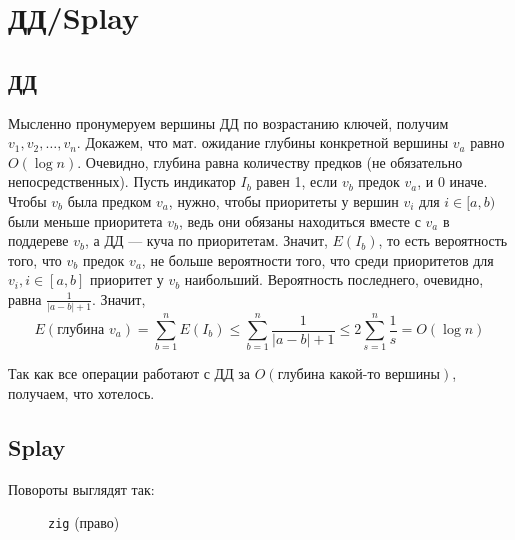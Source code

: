 \section{ДД/Splay}

\subsection{ДД}
Мысленно пронумеруем вершины ДД по возрастанию ключей, получим $v_1, v_2, \ldots, v_n$. Докажем, что мат. ожидание глубины конкретной вершины $v_a$ равно $O(\log n)$. Очевидно, глубина равна количеству предков (не обязательно непосредственных). Пусть индикатор $I_b$ равен 1, если $v_b$ предок $v_a$, и 0 иначе. Чтобы $v_b$ была предком $v_a$, нужно, чтобы приоритеты у вершин $v_i$ для $i \in [a, b)$ были меньше приоритета $v_b$, ведь они обязаны находиться вместе с $v_a$ в поддереве $v_b$, а ДД --- куча по приоритетам. Значит, $E(I_b)$, то есть вероятность того, что $v_b$ предок $v_a$, не больше вероятности того, что среди приоритетов для $v_i, i \in [a, b]$ приоритет у $v_b$ наибольший. Вероятность последнего, очевидно, равна $\frac{1}{|a - b| + 1}$. Значит,
\[
E(\text{глубина }v_a) = \sum_{b = 1}^n E(I_b) \leq \sum_{b = 1}^n \frac{1}{|a - b| + 1} \leq 2 \sum_{s = 1}^{n} \frac{1}{s} = O(\log n)
\]

Так как все операции работают с ДД за $O(\text{глубина какой-то вершины})$, получаем, что хотелось.

\subsection{Splay}
\newcommand{\sz}{\operatorname{sz}}


Повороты выглядят так:
\begin{figure}[htbp]
    \centering
    \captionsetup{labelformat=empty}
    \caption{\texttt{zig} (право)}
\end{figure}

